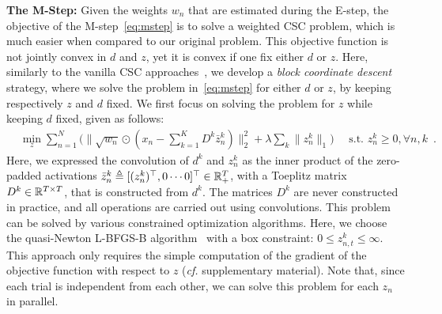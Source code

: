 


\textbf{The M-Step:} 
Given the weights $w_n$ that are estimated during the E-step, the objective of the M-step~\eqref{eq:mstep} is to solve a weighted \ac{CSC} problem, which is much easier when compared to our original problem. 
%
This objective function is not jointly convex in $d$ and $z$, yet it is convex if one fix
either $d$ or $z$.
Here, similarly to the vanilla \ac{CSC} approaches~\citep{gips2017discovering,Grosse-etal:2007}, we develop a \emph{block coordinate descent} strategy, where we solve the problem in~\eqref{eq:mstep} for either $d$ or $z$, by keeping respectively $z$ and $d$ fixed.
%
%
%
We first focus on solving the problem for $z$ while keeping $d$ fixed, given as follows:
\begin{align}
& \min_{z} \sum_{n=1}^{N} \Big( \|\sqrt{w_{n}} \odot (x_{n} - \sum_{k=1}^{K}D^{k} \bar{z}_{n}^{k})\|_{2}^{2} + \lambda \sum_{k}{ \|{z}_{n}^{k} \|_1}\Big) \quad \text{ s.t.  } {z}_n^k \geq 0, \forall n,k\enspace .
\label{eq:problem_definition_z}
\end{align} 
Here, we expressed the convolution of $d^k$ and $z_n^k$ as the inner product of the zero-padded activations $\bar{z}_n^k \triangleq [(z_n^k)^\top, 0 \cdots 0]^\top \in \mathbb{R}^{T}_+$, with a Toeplitz matrix $D^k \in \mathbb{R}^{T \times T}$, that is constructed from $d^k$.
The matrices $D^k$ are never constructed in practice, and all operations are carried out using convolutions.
This problem can be solved by various constrained optimization algorithms. Here, we choose the quasi-Newton L-BFGS-B algorithm~\cite{byrd1995limited} with a box constraint: $0 \leq z_{n,t}^k \leq \infty$. This approach only requires the simple computation of the gradient of the objective function with respect to $z$ (\textit{cf.} supplementary material). Note that, since each trial is independent from each other, we can solve this problem for each $z_n$ in parallel. 

